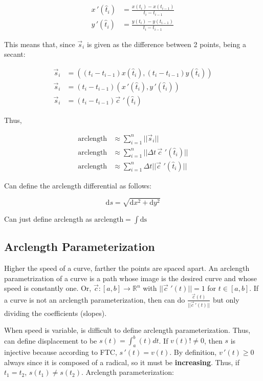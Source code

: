 \begin{align*}
    x\,'(\hat{t}_i)&=\frac{x(t_i)-x(t_{i-1})}{t_i-t_{i-1}}\\
    y\,'(\hat{t}_i)&=\frac{y(t_i)-y(t_{i-1})}{t_i-t_{i-1}}
\end{align*}

This means that, since $\vec{s}_i$ is given as the difference between 2 points,
being a secant:

\begin{align*}
    \vec{s}_i&=\left((t_i-t_{i-1})x(\hat{t}_i), (t_i-t_{i-1})y(\hat{t}_i)\right )\\
    \vec{s}_i&=(t_i-t_{i-1})\left(x\,'(\hat{t}_i),y\,'(\hat{t}_i)\right)\\
    \vec{s}_i&=(t_i-t_{i-1})\vec{c}\,\,'(\hat{t}_i)
\end{align*}

Thus,

\begin{align*}
    \mbox{arclength}&\approx\sum_{i=1}^n||\vec{s}_i||\\
    \mbox{arclength}&\approx\sum_{i=1}^n||\Delta t \,\vec{c}\,\,'(\hat{t}_i)||\\
    \mbox{arclength}&\approx\sum_{i=1}^n\Delta t||\vec{c}\,\,'(\hat{t}_i)||
\end{align*}

Can define the arclength differential as follows:

\[\mathrm{d}s=\sqrt{\mathrm{d}x^2+\mathrm{d}y^2}\]

Can just define arclength as $\text{arclength}=\int \mathrm{ds}$

\subsection{Arclength Parameterization}

Higher the speed of a curve, farther the points are spaced apart.
An arclength parametrization of a curve is a path whose image is the desired curve and whose speed is constantly one.
Or, $\vec{c}:[a,b]\to\mathbb{R}^n$ with $||\vec{c}\,\,'(t)||=1$ for $t\in[a,b]$.
If a curve is not an arclength parameterization, then can do $\frac{\vec{c}(t)}{||\vec{c}\,'(t)||}$ but only dividing the coefficients (slopes).\newline

\noindent
When speed is variable, is difficult to define arclength parameterization.
Thus, can define displacement to be $s(t)=\int_a^b (t)dt$. If $v(t)!\neq 0$,
then $s$ is injective because according to FTC, $s\,'(t)=v(t)$.
By definition, $v\,'(t)\geq 0$ always since it is composed of a radical, so it must be \textbf{increasing}.
Thus, if $t_1=t_2$, $s(t_1)\neq s(t_2)$. Arclength parameterization:

